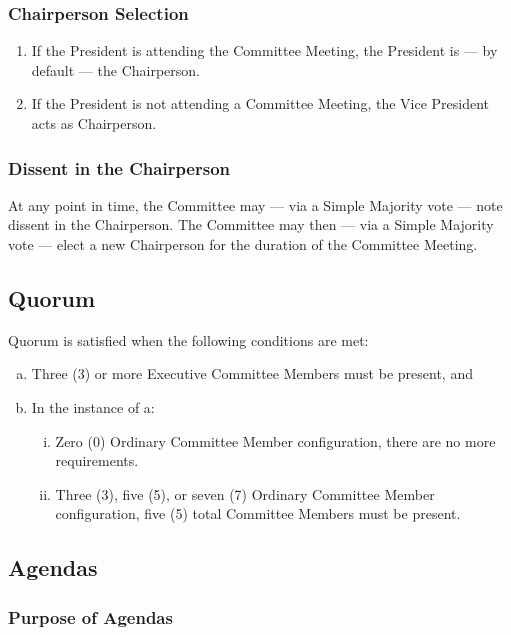 \documentclass[a4paper,12pt]{article}
\begin{document}
\subsubsection{Chairperson Selection}

\begin{enumerate}
	\item If the President is attending the Committee Meeting, the President is --- by default --- the Chairperson.
	\item If the President is not attending a Committee Meeting, the Vice President acts as Chairperson.
\end{enumerate}

\subsubsection{Dissent in the Chairperson}

At any point in time, the Committee may --- via a Simple Majority vote --- note dissent in the Chairperson. The Committee may then --- via a Simple Majority vote --- elect a new Chairperson for the duration of the Committee Meeting.

\subsection{Quorum}

Quorum is satisfied when the following conditions are met:

\begin{enumerate}[a)]
	\item Three (3) or more Executive Committee Members must be present, and
	\item In the instance of a:
	\begin{enumerate}[i)]
		\item Zero (0) Ordinary Committee Member configuration, there are no more requirements.
		\item Three (3), five (5), or seven (7) Ordinary Committee Member configuration, five (5) total Committee Members must be present.
	\end{enumerate}
\end{enumerate}

\subsection{Agendas}

\subsubsection{Purpose of Agendas}
\end{document}
